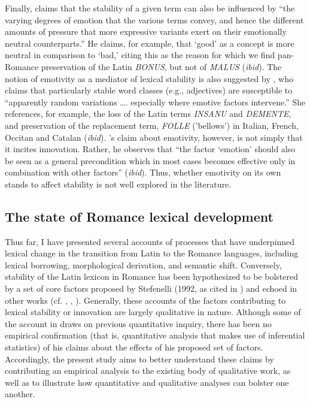 \documentclass[output=paper,colorlinks,citecolor=brown,
]{langscibook}
\begin{document}
Finally, \citet[579]{stefenelli_lexical_2011} claims that the stability of a given term can also be influenced by “the varying degrees of emotion that the various terms convey, and hence the different amounts of pressure that more expressive variants exert on their emotionally neutral counterparts.” He claims, for example, that ‘good’ as a concept is more neutral in comparison to ‘bad,’ citing this as the reason for which we find pan-Romance preservation of the Latin \textit{BONUS}, but not of \textit{MALUS} (\textit{ibid}). The notion of emotivity as a mediator of lexical stability is also suggested by \citet[325]{posner_romance_1996}, who claims that particularly stable word classes (e.g., adjectives) are susceptible to “apparently random variations …. especially where emotive factors intervene.” She references, for example, the loss of the Latin terms \textit{INSANU} and \textit{DEMENTE}, and preservation of the replacement term, \textit{FOLLE} ('bellows') in Italian, French, Occitan and Catalan (\textit{ibid}). \citet[580]{stefenelli_lexical_2011}'s claim about emotivity, however, is not simply that it incites innovation. Rather, he observes that “the factor ‘emotion’ should also be seen as a general precondition which in most cases becomes effective only in combination with other factors” (\textit{ibid}). Thus, whether emotivity on its own stands to affect stability is not well explored in the literature.

\subsection{The state of Romance lexical development}
Thus far, I have presented several accounts of processes that have underpinned lexical change in the transition from Latin to the Romance languages, including lexical borrowing, morphological derivation, and semantic shift. Conversely, stability of the Latin lexicon in Romance has been hypothesized to be bolstered by a set of core factors proposed by Stefenelli (1992, as cited in \citealt{stefenelli_lexical_2011}) and echoed in other works (cf. \citealt{alkire_romance_2010}, \citealt{glessgen_linguistique_2007}, \citealt{posner_romance_1996}). Generally, these accounts of the factors contributing to lexical stability or innovation are largely qualitative in nature. Although some of the account in \citealt{stefenelli_lexical_2011} draws on previous quantitative inquiry, there has been no empirical confirmation (that is, quantitative analysis that makes use of inferential statistics) of his claims about the effects of his proposed set of factors. Accordingly, the present study aims to better understand these claims by contributing an empirical analysis to the existing body of qualitative work, as well as to illustrate how quantitative and qualitative analyses can bolster one another.  
\end{document}
